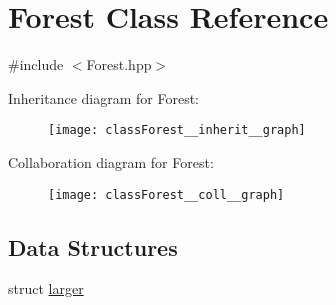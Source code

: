 \hypertarget{classForest}{}\section{Forest Class Reference}
\label{classForest}


{\ttfamily \#include $<$Forest.\+hpp$>$}



Inheritance diagram for Forest\+:\nopagebreak
\begin{figure}[H]
\begin{center}
\leavevmode
\texttt{[image: classForest\_\_inherit\_\_graph]}
\end{center}
\end{figure}


Collaboration diagram for Forest\+:\nopagebreak
\begin{figure}[H]
\begin{center}
\leavevmode
\texttt{[image: classForest\_\_coll\_\_graph]}
\end{center}
\end{figure}
\subsection*{Data Structures}
\begin{DoxyCompactItemize}
\item 
struct \hyperlink{structForest_1_1larger}{larger}
\end{DoxyCompactItemize}
